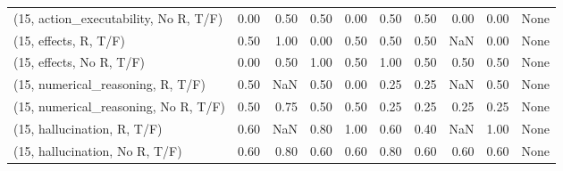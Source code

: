 \begin{table*}[h!]
\begin{adjustbox}{width=2\columnwidth,center}
\begin{tabular}{lrrr|rrr|rrr}
(15, action\_executability, No R, T/F) &                      0.00 &                  0.50 &                      0.50 &                          0.00 &                      0.50 &                          0.50 &                                   0.00 &                               0.00 &                                  None \\
(15, effects, R, T/F)                 &                      0.50 &                  1.00 &                      0.00 &                          0.50 &                      0.50 &                          0.50 &                                    NaN &                               0.00 &                                  None \\
(15, effects, No R, T/F)              &                      0.00 &                  0.50 &                      1.00 &                          0.50 &                      1.00 &                          0.50 &                                   0.50 &                               0.50 &                                  None \\
(15, numerical\_reasoning, R, T/F)     &                      0.50 &                   NaN &                      0.50 &                          0.00 &                      0.25 &                          0.25 &                                    NaN &                               0.50 &                                  None \\
(15, numerical\_reasoning, No R, T/F)  &                      0.50 &                  0.75 &                      0.50 &                          0.50 &                      0.25 &                          0.25 &                                   0.25 &                               0.25 &                                  None \\
(15, hallucination, R, T/F)           &                      0.60 &                   NaN &                      0.80 &                          1.00 &                      0.60 &                          0.40 &                                    NaN &                               1.00 &                                  None \\
(15, hallucination, No R, T/F)        &                      0.60 &                  0.80 &                      0.60 &                          0.60 &                      0.80 &                          0.60 &                                   0.60 &                               0.60 &                                  None \\

\end{tabular}
\end{adjustbox}
\end{table*}
